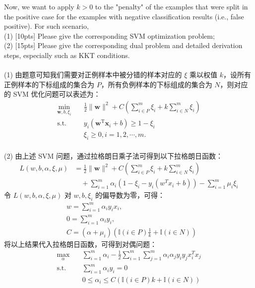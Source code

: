 \documentclass{article}
\begin{document}
    Now, we want to apply $k>0$ to the "penalty" of the examples that were split in the positive case for the examples with negative classification results (i.e., false positive). For such scenario,\\
   (1) [10pts] Please give the corresponding SVM optimization problem;\\
   (2) [15pts] Please give the corresponding dual problem and detailed derivation steps, especially such as KKT conditions.\\\\
   (1) 由题意可知我们需要对正例样本中被分错的样本对应的 $\xi$ 乘以权值 $k$，设所有正例样本的下标组成的集合为 $P$，所有负例样本的下标组成的集合为 $N$，则对应的 SVM 优化问题可以表述为：
   	\begin{equation}
   	\begin{aligned}
   	\min_{\mathbf{w},b,\xi_i}& \quad \frac{1}{2} \lVert \mathbf{w} \rVert^2 + C\left(\sum_{i\in P}^m\xi_i + k\sum_{i\in N}^m\xi_i\right) \\
   	\text{s.t.}&  \quad y_i(\mathbf{w}^\mathrm{T}\mathbf{x}_i + b)\geq 1-\xi_i \\
   	& \quad \xi_i \geq 0, i = 1,2,\cdots,m.
   	\end{aligned}
   	\end{equation} \\
   (2) 由上述 SVM 问题，通过拉格朗日乘子法可得到以下拉格朗日函数：
   	\begin{equation}
	\begin{aligned}
	L(w,b,\alpha,\xi,\mu)
	&= \frac{1}{2} \lVert \mathbf{w} \rVert^2 + C\left(\sum_{i\in P}^m\xi_i + k\sum_{i\in N}^m\xi_i\right) \\
	&\quad + \sum_{i=1}^m\alpha_i(1-\xi_i-y_i(w^Tx_i+b)) - \sum_{i=1}^m\mu_i\xi_i
   	\end{aligned}
   	\end{equation}
	令 $L(w,b,\alpha,\xi,\mu)$ 对 $w,b,\xi_i$ 的偏导数为零，可得：
	\begin{equation}
	\begin{aligned}
	&w = \sum_{i=1}^m\alpha_iy_ix_i,\\
	&0 = \sum_{i=1}^m\alpha_iy_i, \\
	&C = (\alpha + \mu_i)(\mathbb{I}(i\in P)\frac{1}{k} + \mathbb{I}(i\in N))
	\end{aligned}
	\end{equation}
	将以上结果代入拉格朗日函数，可得到对偶问题：
	\begin{equation}
	\begin{aligned}
	\max_{\alpha}& \quad \sum_{i=1}^m\alpha_i - \frac{1}{2} \sum_{i=1}^m \sum_{j=1}^m \alpha_i\alpha_jy_iy_jx_i^Tx_j \\
	\text{s.t.}& \quad \sum_{i=1}^m \alpha_iy_i = 0 \\
	& \quad 0 \leq \alpha_i \leq C(\mathbb{I}(i\in P)k + \mathbb{I}(i\in N))
	\end{aligned}
	\end{equation}
\end{document}
